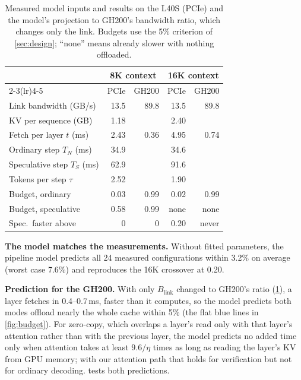 \documentclass{article}
\begin{document}
\begin{table}[t]
\caption{Measured model inputs and results on the L40S (PCIe) and the model's projection to GH200's bandwidth ratio, which changes only the link. Budgets use the 5\% criterion of \cref{sec:design}; ``none'' means already slower with nothing offloaded.}
\label{tab:inputs}
\vskip 0.1in
\begin{center}
\begin{small}
\setlength{\tabcolsep}{3.2pt}
\begin{tabular}{@{}lrrrr@{}}
\toprule
 & \multicolumn{2}{c}{8K context} & \multicolumn{2}{c}{16K context} \\
\cmidrule(lr){2-3}\cmidrule(lr){4-5}
 & PCIe & GH200 & PCIe & GH200 \\
\midrule
Link bandwidth (GB/s)       & 13.5 & 89.8 & 13.5 & 89.8 \\
KV per sequence (GB)        & 1.18 &      & 2.40 &      \\
Fetch per layer $t$ (ms)    & 2.43 & 0.36 & 4.95 & 0.74 \\
Ordinary step $T_N$ (ms)    & 34.9 &      & 34.6 &      \\
Speculative step $T_S$ (ms) & 62.9 &      & 91.6 &      \\
Tokens per step $\tau$      & 2.52 &      & 1.90 &      \\
\midrule
Budget, ordinary            & 0.03 & 0.99 & 0.02 & 0.99 \\
Budget, speculative         & 0.58 & 0.99 & none & none \\
Spec.\ faster above         & 0    & 0    & 0.20 & never \\
\bottomrule
\end{tabular}
\end{small}
\end{center}
\vskip -0.1in
\end{table}


\textbf{The model matches the measurements.} Without fitted parameters, the pipeline model predicts all 24 measured configurations within 3.2\% on average (worst case 7.6\%) and reproduces the 16K crossover at 0.20.

\textbf{Prediction for the GH200.} With only $B_\text{link}$ changed to GH200's ratio (\cref{tab:inputs}), a layer fetches in 0.4--0.7\,ms, faster than it computes, so the model predicts both modes offload nearly the whole cache within 5\% (the flat blue lines in \cref{fig:budget}). For zero-copy, which overlaps a layer's read only with that layer's attention rather than with the previous layer, the model predicts no added time only when attention takes at least $9.6/\eta$ times as long as reading the layer's KV from GPU memory; with our attention path that holds for verification but not for ordinary decoding.  tests both predictions.
\end{document}
